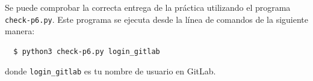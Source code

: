 \documentclass[a4paper,11pt]{article}
\begin{document}
Se puede comprobar la correcta entrega de la práctica utilizando el programa \texttt{check-p6.py}. Este programa se ejecuta desde la línea de comandos de la siguiente manera:
\begin{verbatim}
  $ python3 check-p6.py login_gitlab
\end{verbatim}


donde \texttt{login\_gitlab} es tu nombre de usuario en GitLab.


%
%
\end{document}
